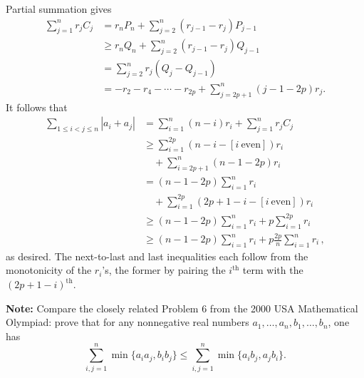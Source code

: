 \documentclass[amssymb,twocolumn,pra,10pt,aps]{revtex4-1}
\begin{document}
\begin{itemize}
Partial summation gives
\begin{align*}
\sum_{j = 1}^n r_j C_j & =  r_n P_n + \sum_{j=2}^{n} (r_{j-1} - r_j)
P_{j-1} \\
& \ge r_n Q_n + \sum_{j=2}^{n} (r_{j-1} - r_j) Q_{j-1} \\
& =  \sum_{j=2}^{n} r_j (Q_j - Q_{j-1}) \\
& =  - r_2 - r_4 - \cdots - r_{2p} + \sum_{j = 2p+1}^{n} (j-1-2p) r_j.
\end{align*}
It follows that
\begin{align*}
\sum_{1 \le i < j \le n} | a_i + a_j | 
    &= \sum_{i = 1}^n (n - i) r_i + \sum_{j = 1}^n r_j C_j \\
& \ge \sum_{i = 1}^{2p} (n - i - [ i \ \text{even}]) r_i \\
&\quad + \sum_{i = 2p+1}^{n} (n - 1 - 2p) r_i \\
&  = (n-1-2p) \sum_{i=1}^{n} r_i \\
&\quad + \sum_{i=1}^{2p} (2p + 1 - i - [i \ \text{even}]) r_i \\
&  \ge  (n-1-2p) \sum_{i=1}^{n} r_i + p \sum_{i=1}^{2p} r_i \\
&  \ge  (n-1-2p) \sum_{i=1}^{n} r_i + p\frac{2p}{n} \sum_{i=1}^{n} r_i\,,
\end{align*}
as desired.  The next-to-last and last inequalities each follow from the
monotonicity of the $r_i$'s, the former by pairing the $i^{\textrm{th}}$
term with the $(2p+1-i)^{\textrm{th}}$.

\textbf{Note:}
Compare the closely related Problem 6 from the 2000 USA Mathematical
Olympiad: prove that
for any nonnegative real numbers $a_1, \dots, a_n, b_1, \dots, b_n$,
one has
\[
\sum_{i,j=1}^n \min\{a_i a_j,b_i b_j\} \leq
\sum_{i,j=1}^n \min\{a_i b_j,a_j b_i\}.
\]

\end{itemize}
\end{document}
